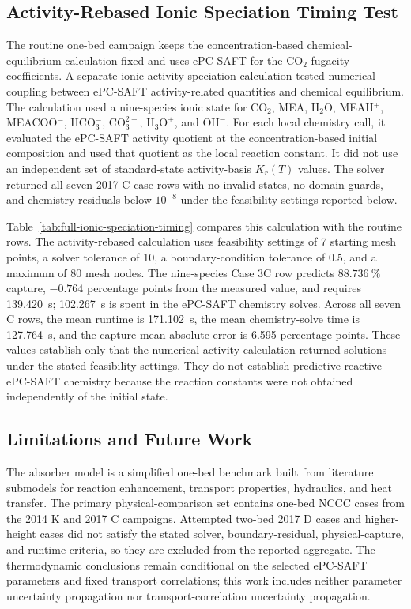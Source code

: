         \FloatBarrier

    \subsection{Activity-Rebased Ionic Speciation Timing Test}
        The routine one-bed campaign keeps the concentration-based chemical-equilibrium calculation fixed and uses ePC-SAFT for the CO$_2$ fugacity coefficients. A separate ionic activity-speciation calculation tested numerical coupling between ePC-SAFT activity-related quantities and chemical equilibrium. The calculation used a nine-species ionic state for CO$_2$, MEA, H$_2$O, MEAH$^+$, MEACOO$^-$, HCO$_3^-$, $\mathrm{CO_3^{2-}}$, $\mathrm{H_3O^+}$, and $\mathrm{OH^-}$. For each local chemistry call, it evaluated the ePC-SAFT activity quotient at the concentration-based initial composition and used that quotient as the local reaction constant. It did not use an independent set of standard-state activity-basis $K_r(T)$ values. The solver returned all seven 2017 C-case rows with no invalid states, no domain guards, and chemistry residuals below $10^{-8}$ under the feasibility settings reported below.

        

Table~\ref{tab:full-ionic-speciation-timing} compares this calculation with the routine rows. The activity-rebased calculation uses feasibility settings of 7 starting mesh points, a solver tolerance of 10, a boundary-condition tolerance of 0.5, and a maximum of 80 mesh nodes. The nine-species Case 3C row predicts $\SI{88.736}{\percent}$ capture, $-0.764$ percentage points from the measured value, and requires \SI{139.420}{s}; \SI{102.267}{s} is spent in the ePC-SAFT chemistry solves. Across all seven C rows, the mean runtime is \SI{171.102}{s}, the mean chemistry-solve time is \SI{127.764}{s}, and the capture mean absolute error is 6.595 percentage points. These values establish only that the numerical activity calculation returned solutions under the stated feasibility settings. They do not establish predictive reactive ePC-SAFT chemistry because the reaction constants were not obtained independently of the initial state.

        \FloatBarrier

    \subsection{Limitations and Future Work}
        The absorber model is a simplified one-bed benchmark built from literature submodels for reaction enhancement, transport properties, hydraulics, and heat transfer. The primary physical-comparison set contains one-bed NCCC cases from the 2014 K and 2017 C campaigns. Attempted two-bed 2017 D cases and higher-height cases did not satisfy the stated solver, boundary-residual, physical-capture, and runtime criteria, so they are excluded from the reported aggregate. The thermodynamic conclusions remain conditional on the selected ePC-SAFT parameters and fixed transport correlations; this work includes neither parameter uncertainty propagation nor transport-correlation uncertainty propagation.

